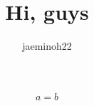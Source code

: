 \documentclass{oblivior}
\title{Hi, guys}
\author{jaeminoh22}
\date{}
\begin{document}
\maketitle
$$a = b$$
\end{document}
